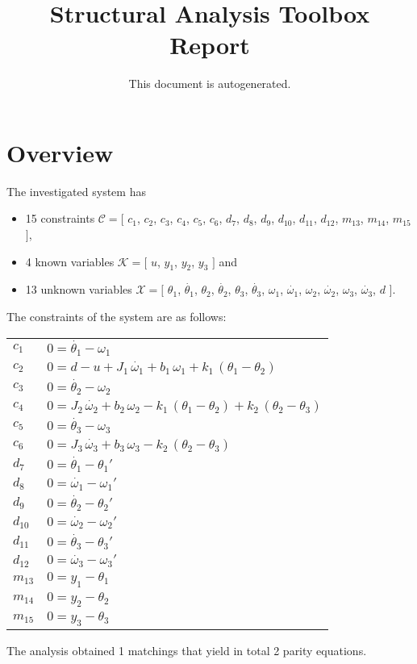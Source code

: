 \documentclass[a4,11pt]{article}
\title{Structural Analysis Toolbox Report}
\author{This document is autogenerated.}
\begin{document}
\maketitle
\section{Overview}
The investigated system has
\begin{itemize}
	\item 15 constraints $\mathcal{C} = [$ $c_1$, $c_2$, $c_3$, $c_4$, $c_5$, $c_6$, $d_7$, $d_8$, $d_9$, $d_{10}$, $d_{11}$, $d_{12}$, $m_{13}$, $m_{14}$, $m_{15}$ $]$,
	\item 4 known variables $\mathcal{K} = [$ $u$, $y_1$, $y_2$, $y_3$ $]$ and
	\item 13 unknown variables $\mathcal{X} = [$ $\theta_1$, $\dot{\theta_1}$, $\theta_2$, $\dot{\theta_2}$, $\theta_3$, $\dot{\theta_3}$, $\omega_1$, $\dot{\omega_1}$, $\omega_2$, $\dot{\omega_2}$, $\omega_3$, $\dot{\omega_3}$, $d$ $]$.
\end{itemize}
The constraints of the system are as follows:
\begin{longtable}{ l | p{} }
	$c_1$ & $ 0=\dot{\theta_1}-\omega _{1} $ \\
	$c_2$ & $ 0=d-u+J_{1}\,\dot{\omega_1}+b_{1}\,\omega _{1}+k_{1}\,\left(\theta _{1}-\theta _{2}\right) $ \\
	$c_3$ & $ 0=\dot{\theta_2}-\omega _{2} $ \\
	$c_4$ & $ 0=J_{2}\,\dot{\omega_2}+b_{2}\,\omega _{2}-k_{1}\,\left(\theta _{1}-\theta _{2}\right)+k_{2}\,\left(\theta _{2}-\theta _{3}\right) $ \\
	$c_5$ & $ 0=\dot{\theta_3}-\omega _{3} $ \\
	$c_6$ & $ 0=J_{3}\,\dot{\omega_3}+b_{3}\,\omega _{3}-k_{2}\,\left(\theta _{2}-\theta _{3}\right) $ \\
	$d_7$ & $ 0=\dot{\theta_1}-\theta _{1}' $ \\
	$d_8$ & $ 0=\dot{\omega_1}-\omega _{1}' $ \\
	$d_9$ & $ 0=\dot{\theta_2}-\theta _{2}' $ \\
	$d_{10}$ & $ 0=\dot{\omega_2}-\omega _{2}' $ \\
	$d_{11}$ & $ 0=\dot{\theta_3}-\theta _{3}' $ \\
	$d_{12}$ & $ 0=\dot{\omega_3}-\omega _{3}' $ \\
	$m_{13}$ & $ 0=y_{1}-\theta _{1} $ \\
	$m_{14}$ & $ 0=y_{2}-\theta _{2} $ \\
	$m_{15}$ & $ 0=y_{3}-\theta _{3} $ \\
\end{longtable}
The analysis obtained 1 matchings that yield in total 2 parity equations.\newpage
\end{document}
